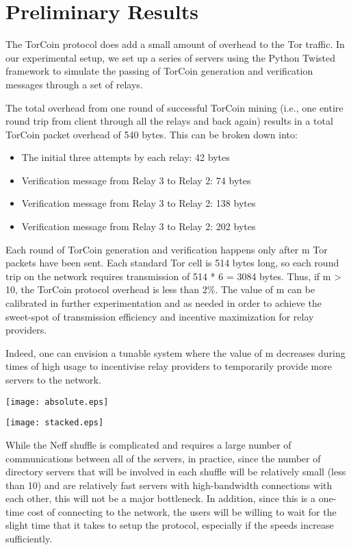 \section{Preliminary Results}

The TorCoin protocol does add a small amount of overhead to the Tor traffic. In our experimental setup, we set up a series of servers using the Python Twisted framework to simulate the passing of TorCoin generation and verification messages through a set of relays. 

The total overhead from one round of successful TorCoin mining (i.e., one entire round trip from client through all the relays and back again) results in a total TorCoin packet overhead of 540 bytes. This can be broken down into: 
\begin{itemize}
\item The initial three attempts by each relay: 42 bytes
\item Verification message from Relay 3 to Relay 2: 74 bytes
\item Verification message from Relay 3 to Relay 2: 138 bytes
\item Verification message from Relay 3 to Relay 2: 202 bytes
\end{itemize}

Each round of TorCoin generation and verification happens only after m Tor packets have been sent. Each standard Tor cell is 514 bytes long, so each round trip on the network requires transmission of 514 * 6 = 3084 bytes. Thus, if m > 10, the TorCoin protocol overhead is less than 2\%. The value of m can be calibrated in further experimentation and as needed in order to achieve the sweet-spot of transmission efficiency and incentive maximization for relay providers.

Indeed, one can envision a tunable system where the value of m decreases during times of high usage to incentivise relay providers to temporarily provide more servers to the network.

\texttt{[image: absolute.eps]}

\texttt{[image: stacked.eps]}

While the Neff shuffle is complicated and requires a large number of communications between all of the servers, in practice, since the number of directory servers that will be involved in each shuffle will be relatively small (less than 10) and are relatively fast servers with high-bandwidth connections with each other, this will not be a major bottleneck. In addition, since this is a one-time cost of connecting to the network, the users will be willing to wait for the slight time that it takes to setup the protocol, especially if the speeds increase sufficiently.